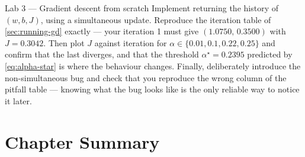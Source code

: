 \begin{labbox}{Lab 3 --- Gradient descent from scratch}
Implement  returning the history of
$(w, b, J)$, using a simultaneous update. Reproduce the iteration table of
\cref{sec:running-gd} exactly --- your iteration 1 must give
$(1.0750,\,0.3500)$ with $J = 0.3042$. Then plot $J$ against iteration for
$\alpha \in \{0.01, 0.1, 0.22, 0.25\}$ and confirm that the last diverges, and
that the threshold $\alpha^\star = 0.2395$ predicted by
\cref{eq:alpha-star} is where the behaviour changes. Finally, deliberately
introduce the non-simultaneous bug and check that you reproduce the wrong
column of the pitfall table --- knowing what the bug looks like is the only
reliable way to notice it later.
\end{labbox}

\section*{Chapter Summary}

